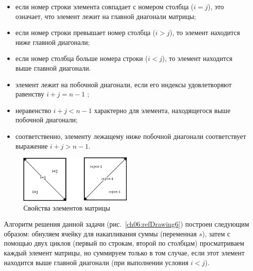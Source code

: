 \begin{itemize}
\item если номер строки элемента совпадает с номером столбца ($i=j$), это означает, что элемент лежит на главной
диагонали матрицы; 
\item если номер строки превышает номер столбца ($i>j$), то элемент находится ниже главной диагонали;
\item если номер столбца больше номера строки ($i<j$), то элемент находится выше главной диагонали.
\item элемент лежит на побочной диагонали, если его индексы удовлетворяют равенству  $i+j=n-1$ ; 
\item неравенство  $i+j<n-1$  характерно для элемента, находящегося выше побочной диагонали;
\item соответственно, элементу лежащему ниже побочной диагонали соответствует выражение  $i+j>n-1$.
\end{itemize}


\begin{figure}[htb]
\begin{center}
\includegraphics[width=0.5\textwidth]{img/ris_6_6}
\caption{Свойства элементов матрицы}
\label{ch06:refDrawing5}
\end{center}
\end{figure}


Алгоритм решения данной задачи (рис.~\ref{ch06:refDrawing6}) построен следующим образом: обнуляем ячейку для
накапливания суммы (переменная $s$), затем с помощью двух циклов (первый по строкам, второй по столбцам) просматриваем
каждый элемент матрицы, но суммируем только в том случае, если этот элемент находится выше главной
диагонали (при выполнении условия  $i<j$).


